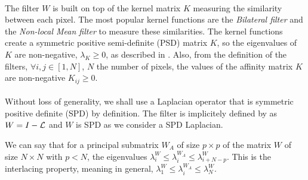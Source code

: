 \paragraph{}
The filter \(W\) is built on top of the kernel matrix \(K\) measuring the similarity between each pixel.
The most popular kernel functions are the \textit{Bilateral filter} \cite{bilateral_tomasi_1998} and the \textit{Non-local Mean filter} \cite{kervrann_nlm_2006} to measure these similarities.
The kernel functions create a symmetric positive semi-definite (PSD) matrix \(K\), so the eigenvalues of \(K\) are non-negative, \(\lambda_K \ge 0\), as described in \cite{talebi_fast_2016}.
Also, from the definition of the filters, \(\forall i, j \in [1, N]\), \(N\) the number of pixels, the values of the affinity matrix \(K\) are non-negative \(K_{ij} \ge 0\).

\paragraph{}
Without loss of generality, we shall use a Laplacian operator that is symmetric positive definite (SPD) by definition.
The filter is implicitely defined by \cite{modern_tour_2013} as \(W = I - \operatorname{\mathcal{L}}\) and \(W\) is SPD as we consider a SPD Laplacian.

We can say that for a principal submatrix \(W_A\) of size \(p \times p\) of the matrix \(W\) of size \(N \times N\) with \(p < N\), the eigenvalues \(\lambda^W_i \le \lambda^{W_A}_i \le \lambda^W_{i+N-p}\).
This is the interlacing property, meaning in general, \(\lambda^W_1 \le \lambda^{W_A}_i \le \lambda^W_N\).

